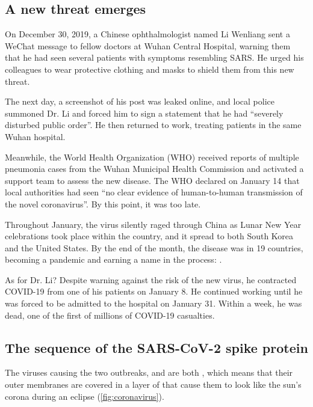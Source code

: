 \FloatBarrier
{}
\subsection{A new threat emerges}

On December 30, 2019, a Chinese ophthalmologist named Li Wenliang sent a WeChat message to fellow doctors at Wuhan Central Hospital, warning them that he had seen several patients with symptoms resembling SARS. He urged his colleagues to wear protective clothing and masks to shield them from this new threat.

The next day, a screenshot of his post was leaked online, and local police summoned Dr. Li and forced him to sign a statement that he had ``severely disturbed public order''. He then returned to work, treating patients in the same Wuhan hospital.

Meanwhile, the World Health Organization (WHO) received reports of multiple pneumonia cases from the Wuhan Municipal Health Commission and activated a support team to assess the new disease. The WHO declared on January 14 that local authorities had seen ``no clear evidence of human-to-human transmission of the novel coronavirus''. By this point, it was too late.

Throughout January, the virus silently raged through China as Lunar New Year celebrations took place within the country, and it spread to both South Korea and the United States. By the end of the month, the disease was in 19 countries, becoming a pandemic and earning a name in the process: .

As for Dr. Li? Despite warning against the risk of the new virus, he contracted COVID-19 from one of his patients on January 8. He continued working until he was forced to be admitted to the hospital on January 31. Within a week, he was dead, one of the first of millions of COVID-19 casualties.

\FloatBarrier
{}
\subsection{The sequence of the SARS-CoV-2 spike protein}

The viruses causing the two outbreaks,  and  are both , which means that their outer membranes are covered in a layer of  that cause them to look like the sun's corona during an eclipse (\autoref{fig:coronavirus}).

